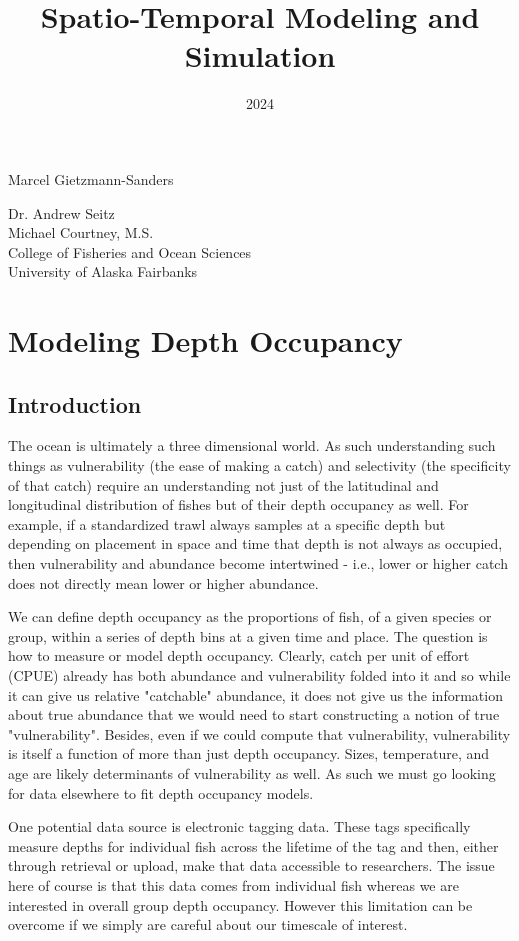\documentclass[11pt]{article}
\title{Spatio-Temporal Modeling and Simulation}
\date{2024}
\makeatletter
\renewcommand{\maketitle}{
\begin{center}

\pagestyle{empty}
\phantom{.}  %
\vspace{3cm}

{\Huge \bf \@title\par}
\vspace{2.5cm}

{\LARGE Marcel Gietzmann-Sanders}\\[1cm]

{\Large\@date}

\vspace{2.5cm}
{\Large Dr. Andrew Seitz}\hspace{2cm}{\Large Dr. Curry Cunningham}\\[2cm]{\Large Michael Courtney, M.S.}\\[2cm]
College of Fisheries and Ocean Sciences\\
University of Alaska Fairbanks


\end{center}
}\makeatother
\makeatother
\begin{document}
\maketitle
\newpage
\tableofcontents

\newpage

\section{Modeling Depth Occupancy}

\subsection{Introduction}

The ocean is ultimately a three dimensional world. As such understanding such things as vulnerability (the ease of making a catch) and selectivity (the specificity of that catch) require an understanding not just of the latitudinal and longitudinal distribution of fishes but of their depth occupancy as well. For example, if a standardized trawl always samples at a specific depth but depending on placement in space and time that depth is not always as occupied, then vulnerability and abundance become intertwined - i.e., lower or higher catch does not directly mean lower or higher abundance. 

We can define depth occupancy as the proportions of fish, of a given species or group, within a series of depth bins at a given time and place. The question is how to measure or model depth occupancy. Clearly, catch per unit of effort (CPUE) already has both abundance and vulnerability folded into it and so while it can give us relative "catchable" abundance, it does not give us the information about true abundance that we would need to start constructing a notion of true "vulnerability". Besides, even if we could compute that vulnerability, vulnerability is itself a function of more than just depth occupancy. Sizes, temperature, and age are likely determinants of vulnerability as well. As such we must go looking for data elsewhere to fit depth occupancy models.

One potential data source is electronic tagging data. These tags specifically measure depths for individual fish across the lifetime of the tag and then, either through retrieval or upload, make that data accessible to researchers. The issue here of course is that this data comes from individual fish whereas we are interested in overall group depth occupancy. However this limitation can be overcome if we simply are careful about our timescale of interest. \newline
\end{document}
